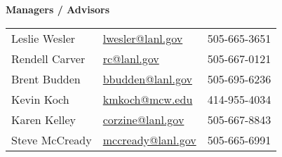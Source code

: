 
\begin{minipage}{0.45\textwidth} 
	\begin{center}
		{\normalsize \textbf{Managers / Advisors}}
	\end{center}
	\begin{tabular}{lll|}
		Leslie Wesler &   \href{mailto:lwesler@lanl.gov}{lwesler@lanl.gov} & 505-665-3651 \\
		Rendell Carver &   \href{mailto:rc@lanl.gov}{rc@lanl.gov} & 505-667-0121 \\
		Brent Budden & \href{mailto:bbudden@lanl.gov}{bbudden@lanl.gov} & 505-695-6236 \\
		Kevin Koch & \href{mailto:kmkoch@mcw.edu}{kmkoch@mcw.edu} & 414-955-4034 \\
		Karen Kelley &  \href{mailto:corzine@lanl.gov}{corzine@lanl.gov} & 505-667-8843 \\
		Steve McCready & \href{mailto:mccready@lanl.gov}{mccready@lanl.gov} & 505-665-6991 \\
	\end{tabular}
\end{minipage}%
\hspace{2mm}
